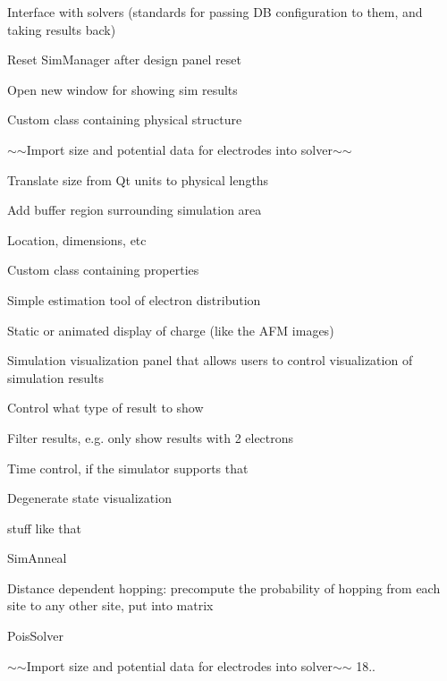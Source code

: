 \begin{DoxyItemize}
\item Interface with solvers (standards for passing DB configuration to them, and taking results back)
\item Reset Sim\+Manager after design panel reset
\item Open new window for showing sim results
\item Custom class containing physical structure
\begin{DoxyItemize}
\item $\sim$$\sim$\+Import size and potential data for electrodes into solver$\sim$$\sim$
\item Translate size from Qt units to physical lengths
\item Add buffer region surrounding simulation area
\end{DoxyItemize}
\item Location, dimensions, etc
\begin{DoxyItemize}
\item Custom class containing properties
\end{DoxyItemize}
\item Simple estimation tool of electron distribution
\item Static or animated display of charge (like the A\+FM images)
\item Simulation visualization panel that allows users to control visualization of simulation results
\begin{DoxyItemize}
\item Control what type of result to show
\item Filter results, e.\+g. only show results with 2 electrons
\item Time control, if the simulator supports that
\item Degenerate state visualization
\item stuff like that
\end{DoxyItemize}
\item Sim\+Anneal
\begin{DoxyItemize}
\item Distance dependent hopping\+: precompute the probability of hopping from each site to any other site, put into matrix
\end{DoxyItemize}
\item Pois\+Solver
\begin{DoxyItemize}
\item $\sim$$\sim$\+Import size and potential data for electrodes into solver$\sim$$\sim$ 18..

\end{DoxyItemize}
\end{DoxyItemize}
